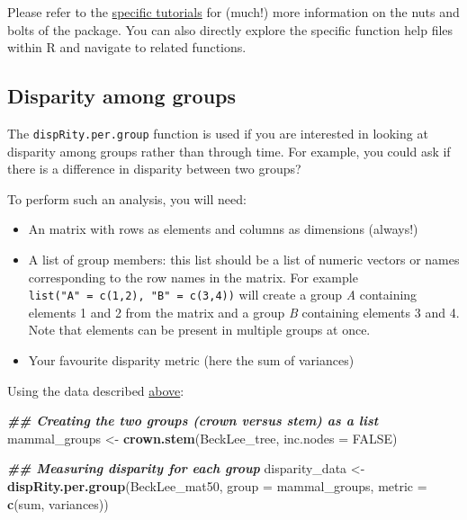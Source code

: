 \documentclass[
]{book}
\newenvironment{Shaded}{\begin{snugshade}}{\end{snugshade}}
\newcommand{\AttributeTok}[1]{\textcolor[rgb]{0.13,0.29,0.53}{#1}}
\newcommand{\ConstantTok}[1]{\textcolor[rgb]{0.56,0.35,0.01}{#1}}
\newcommand{\DocumentationTok}[1]{\textcolor[rgb]{0.56,0.35,0.01}{\textbf{\textit{#1}}}}
\newcommand{\FunctionTok}[1]{\textcolor[rgb]{0.13,0.29,0.53}{\textbf{#1}}}
\newcommand{\NormalTok}[1]{#1}
\newcommand{\OtherTok}[1]{\textcolor[rgb]{0.56,0.35,0.01}{#1}}
\providecommand{\tightlist}{%
  \setlength{\itemsep}{0pt}\setlength{\parskip}{0pt}}
\begin{document}
Please refer to the \protect\hyperlink{specific-tutorial}{specific tutorials} for (much!) more information on the nuts and bolts of the package.
You can also directly explore the specific function help files within R and navigate to related functions.

\hypertarget{disparity-among-groups}{%
\subsection{Disparity among groups}\label{disparity-among-groups}}

The \texttt{dispRity.per.group} function is used if you are interested in looking at disparity among groups rather than through time.
For example, you could ask if there is a difference in disparity between two groups?

To perform such an analysis, you will need:

\begin{itemize}
\tightlist
\item
  An matrix with rows as elements and columns as dimensions (always!)
\item
  A list of group members: this list should be a list of numeric vectors or names corresponding to the row names in the matrix. For example \texttt{list("A"\ =\ c(1,2),\ "B"\ =\ c(3,4))} will create a group \emph{A} containing elements 1 and 2 from the matrix and a group \emph{B} containing elements 3 and 4. Note that elements can be present in multiple groups at once.
\item
  Your favourite disparity metric (here the sum of variances)
\end{itemize}

Using the \citet{beckancient2014} data described \protect\hyperlink{example-data}{above}:

\begin{Shaded}
\begin{Highlighting}[]
\DocumentationTok{\#\# Creating the two groups (crown versus stem) as a list}
\NormalTok{mammal\_groups }\OtherTok{\textless{}{-}} \FunctionTok{crown.stem}\NormalTok{(BeckLee\_tree, }\AttributeTok{inc.nodes =} \ConstantTok{FALSE}\NormalTok{)}

\DocumentationTok{\#\# Measuring disparity for each group}
\NormalTok{disparity\_data }\OtherTok{\textless{}{-}} \FunctionTok{dispRity.per.group}\NormalTok{(BeckLee\_mat50,}
                                     \AttributeTok{group =}\NormalTok{ mammal\_groups,}
                                     \AttributeTok{metric =} \FunctionTok{c}\NormalTok{(sum, variances))}
\end{Highlighting}
\end{Shaded}
\end{document}
